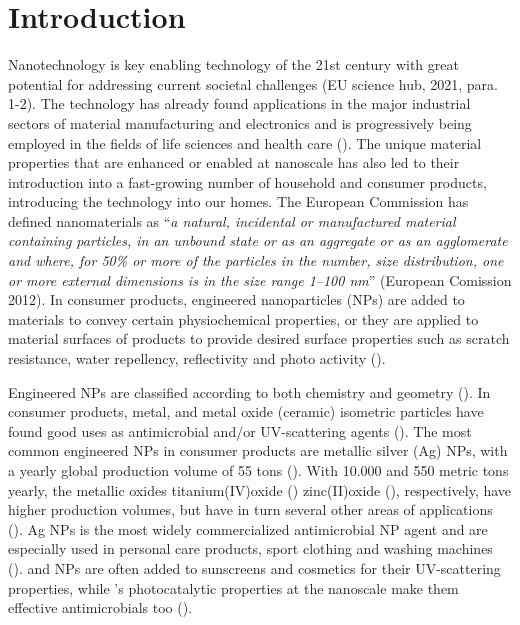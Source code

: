 \chapter{Introduction}

Nanotechnology is key enabling technology of the 21st century with great potential for addressing current societal challenges (EU science hub, 2021, para. 1-2). The technology has already found applications in the major industrial sectors of material manufacturing and electronics and is progressively being employed in the fields of life sciences and health care (\cite{Talebian2021}). The unique material properties that are enhanced or enabled at nanoscale has also led to their introduction into a fast-growing number of household and consumer products, introducing the technology into our homes. The European Commission has defined nanomaterials as “\emph{a natural, incidental or manufactured material containing particles, in an unbound state or as an aggregate or as an agglomerate and where, for 50\% or more of the particles in the number, size distribution, one or more external dimensions is in the size range 1–100 nm}” (European Comission 2012). In consumer products, engineered nanoparticles (NPs) are added to materials to convey certain physiochemical properties, or they are applied to material surfaces of products to provide desired surface properties such as scratch resistance, water repellency, reflectivity and photo activity (\cite{Bodarenko2013, Weir2012}).

Engineered NPs are classified according to both chemistry and geometry (\cite{Warheit2018}). In consumer products, metal, and metal oxide (ceramic) isometric particles have found good uses as antimicrobial and/or UV-scattering agents (\cite{Bodarenko2013}). The most common engineered NPs in consumer products are metallic silver (Ag) NPs, with a yearly global production volume of 55 tons (\cite{Piccinno2012}). With 10.000 and 550 metric tons yearly, the metallic oxides titanium(IV)oxide () zinc(II)oxide (), respectively, have higher production volumes, but have in turn several other areas of applications (\cite{Piccinno2012, Bodarenko2013}). Ag NPs is the most widely commercialized antimicrobial NP agent and are especially used in personal care products, sport clothing and washing machines (\cite{Bodarenko2013, Farkas2011}).  and  NPs are often added to sunscreens and cosmetics for their UV-scattering properties, while {}'s photocatalytic properties at the nanoscale make them effective antimicrobials too (\cite{Bodarenko2013, Weir2012}).

